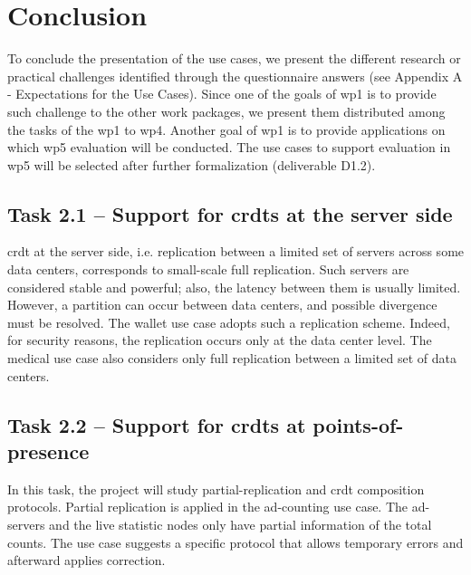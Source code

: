 \documentclass[11pt,a4paper]{report}
\begin{document}
\chapter{Conclusion}
To conclude the presentation of the use cases, we present the different research or practical challenges identified through the questionnaire answers (see Appendix A - Expectations for the Use Cases). Since one of the goals of \gls{wp1} is to provide such challenge to the other work packages, we present them distributed among the tasks of the \gls{wp1} to \gls{wp4}. Another goal of \gls{wp1} is to provide applications on which \gls{wp5} evaluation will be conducted. The use cases to support evaluation in \gls{wp5} will be selected after further formalization (deliverable D1.2).  

\section{Task 2.1 -- Support for \glspl{crdt} at the server side}
\gls{crdt} at the server side, i.e. replication between a limited set of servers across some data centers, corresponds to small-scale full replication. Such servers are considered stable and powerful; also, the latency between them is usually limited. However, a partition can occur between data centers, and possible divergence must be resolved.   
The wallet use case adopts such a replication scheme. Indeed, for security reasons, the replication occurs only at the data center level.
The medical use case also considers only full replication between a limited set of data centers.

\section{Task 2.2 --   Support for \glspl{crdt} at points-of-presence}
In this task, the project will study partial-replication and \gls{crdt} composition protocols. Partial replication is applied in the ad-counting use case. The ad-servers and the live statistic nodes only have partial information of the total counts. The use case suggests a specific protocol that allows temporary errors and afterward applies correction.
\end{document}

